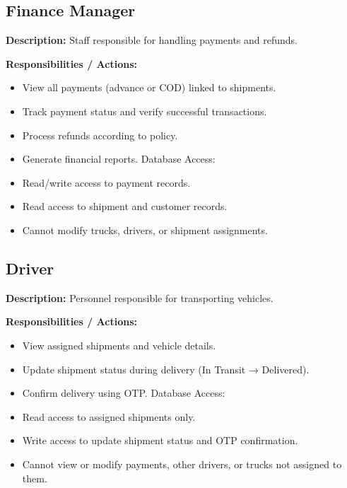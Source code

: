 \documentclass[12pt,a4paper]{article}
\begin{document}
\subsection{Finance Manager}

\textbf{Description:} Staff responsible for handling payments and refunds.

\textbf{Responsibilities / Actions:}

\begin{itemize}
\item View all payments (advance or COD) linked to shipments.
\item Track payment status and verify successful transactions.
\item Process refunds according to policy.
\item Generate financial reports.
Database Access:
\item Read/write access to payment records.
\item Read access to shipment and customer records.
\item Cannot modify trucks, drivers, or shipment assignments.

\end{itemize}

\subsection{Driver}

\textbf{Description:} Personnel responsible for transporting vehicles.

\textbf{Responsibilities / Actions:}

\begin{itemize}
\item View assigned shipments and vehicle details.
\item Update shipment status during delivery (In Transit → Delivered).
\item Confirm delivery using OTP.
Database Access:
\item Read access to assigned shipments only.
\item Write access to update shipment status and OTP confirmation.
\item Cannot view or modify payments, other drivers, or trucks not assigned to them.

\end{itemize}

\end{document}
